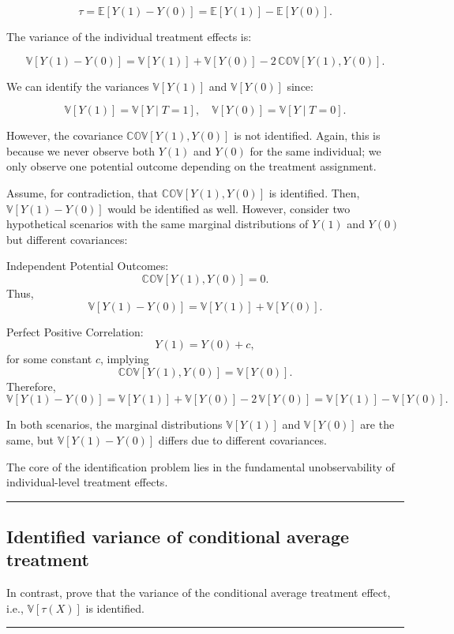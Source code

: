\documentclass{article}
\newenvironment{colorparagraph}[1]{\par\color{#1}}{\par}
\begin{document}
\[
\tau = \mathbb{E}[Y(1) - Y(0)] = \mathbb{E}[Y(1)] - \mathbb{E}[Y(0)].
\]

The variance of the individual treatment effects is:

\[
\mathbb{V}[Y(1) - Y(0)] = \mathbb{V}[Y(1)] + \mathbb{V}[Y(0)] - 2\,\mathbb{COV}[Y(1), Y(0)].
\]

We can identify the variances \(\mathbb{V}[Y(1)]\) and \(\mathbb{V}[Y(0)]\) since:

\[
\mathbb{V}[Y(1)] = \mathbb{V}[Y \mid T = 1], \quad \mathbb{V}[Y(0)] = \mathbb{V}[Y \mid T = 0].
\]

However, the covariance \(\mathbb{COV}[Y(1), Y(0)]\) is not identified. Again, this is because we never observe both \(Y(1)\) and \(Y(0)\) for the same individual; we only observe one potential outcome depending on the treatment assignment.

Assume, for contradiction, that \(\mathbb{COV}[Y(1), Y(0)]\) is identified. Then, \(\mathbb{V}[Y(1) - Y(0)]\) would be identified as well. However, consider two hypothetical scenarios with the same marginal distributions of \(Y(1)\) and \(Y(0)\) but different covariances:

Independent Potential Outcomes:
\[
\mathbb{COV}[Y(1), Y(0)] = 0.
\]
Thus,
\[
\mathbb{V}[Y(1) - Y(0)] = \mathbb{V}[Y(1)] + \mathbb{V}[Y(0)].
\]

Perfect Positive Correlation:
\[
Y(1) = Y(0) + c,
\]
for some constant \(c\), implying
\[
\mathbb{COV}[Y(1), Y(0)] = \mathbb{V}[Y(0)].
\]
Therefore,
\[
\mathbb{V}[Y(1) - Y(0)] = \mathbb{V}[Y(1)] + \mathbb{V}[Y(0)] - 2\,\mathbb{V}[Y(0)] = \mathbb{V}[Y(1)] - \mathbb{V}[Y(0)].
\]

In both scenarios, the marginal distributions \(\mathbb{V}[Y(1)]\) and \(\mathbb{V}[Y(0)]\) are the same, but \(\mathbb{V}[Y(1) - Y(0)]\) differs due to different covariances.

The core of the identification problem lies in the fundamental unobservability of individual-level treatment effects.

\begin{colorparagraph}{questioncolor}
\rule{\textwidth}{0.5pt}

\label{q1b}\subsection{Identified variance of conditional average treatment}
In contrast, prove that the variance of the conditional average treatment effect, i.e., \(\mathbb{V}[\tau(X)]\) is identified.

\rule{\textwidth}{0.5pt}
\end{colorparagraph}
\end{document}
